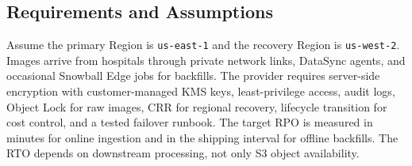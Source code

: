 \subsection{Requirements and Assumptions}
Assume the primary Region is \texttt{us-east-1} and the recovery Region is \texttt{us-west-2}. Images arrive from hospitals through private network links, DataSync agents, and occasional Snowball Edge jobs for backfills. The provider requires server-side encryption with customer-managed KMS keys, least-privilege access, audit logs, Object Lock for raw images, CRR for regional recovery, lifecycle transition for cost control, and a tested failover runbook. The target RPO is measured in minutes for online ingestion and in the shipping interval for offline backfills. The RTO depends on downstream processing, not only S3 object availability.

